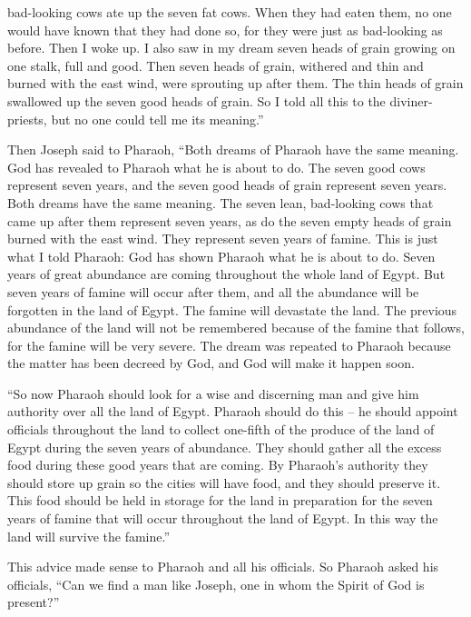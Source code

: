 {bad-looking
cows
ate
up the seven
fat
cows.
When they had eaten
them, no
one would have known
that
they had done
so, for they were just as bad-looking
as before.
Then I woke up.
I also saw
in my dream
seven
heads of grain
growing
on one
stalk,
full
and good.
Then
seven
heads of grain,
withered
and thin
and burned
with the east wind,
were sprouting up
after them.
The thin
heads of grain
swallowed
up the seven
good
heads of grain.
So I told
all this to the diviner-priests,
but no
one could tell me its meaning.”
\par }{\PP {}Then Joseph
said to
Pharaoh,
“Both dreams
of Pharaoh
have
the same
meaning. God
has revealed
to Pharaoh
what he is about to do.
The seven
good
cows
represent seven
years,
and the seven
good
heads of grain
represent
seven
years.
Both dreams
have the same
meaning.
The seven
lean,
bad-looking
cows
that came up
after
them represent seven
years,
as do the seven
empty
heads of grain
burned
with the east wind.
They represent
seven
years
of famine.
This is
just
what
I told
Pharaoh: God
has shown
Pharaoh
what
he is about
to do.
Seven
years
of great
abundance
are coming
throughout the whole
land
of Egypt.
But seven
years
of famine
will occur
after
them, and all
the abundance
will be forgotten
in the land
of Egypt.
The famine
will devastate
the land.
The previous
abundance
of the land
will not
be remembered because
of the famine
that
follows,
for
the famine will be very
severe.
The dream
was repeated
to
Pharaoh
because
the matter
has been decreed
by God,
and God
will make it happen soon.
\par }{\PP {}“So now
Pharaoh
should look
for a wise
and discerning
man
and give him authority
over
all the land
of Egypt.
Pharaoh
should do this – he should appoint officials throughout the land to collect one-fifth of the produce of the land of Egypt during the seven years of abundance.
They should gather
all
the excess food
during these
good
years
that are coming.
By Pharaoh’s
authority they should store up
grain
so the cities
will have food,
and they should preserve it.
This food
should be
held in storage
for the land
in preparation for the seven
years
of famine
that
will
occur throughout the land
of Egypt.
In this way the land
will survive the famine.”
\par }{\PP {}This advice made sense
to Pharaoh
and all
his officials.
So Pharaoh
asked
his officials,
“Can we find
a man
like Joseph, one
in whom
the Spirit
of God is present?”
}
